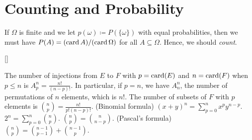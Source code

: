 \documentclass[../probability.tex]{subfiles}
\begin{document}
\section{Counting and Probability}

If \(\Omega\) is finite and we let \(p(\omega) \coloneqq P(\{\omega\})\)
with equal probabilities, then we must have
\(P(A) = (\operatorname{card} A)/(\operatorname{card} \Omega)\) for all \(A \subseteq \Omega\).
Hence, we should \emph{count}.

\begin{Example}{}[]
\begin{itemize}
    \ii
    The number of injections from \(E\) to \(F\)
    with \(p = \operatorname{card}(E)\) and \(n = \operatorname{card}(F)\) when \(p \le n\) is
    \(A_p^n = \frac{n!}{(n-p)!}\).
    \ii
    In particular, if \(p = n\), we have \(A_n^n\),
    the number of permutations of \(n\) elements, which is \(n!\).
    \ii
    The number of subsets of \(F\) with \(p\) elements is
    \(\binom{n}{p} = \frac{n!}{p!(n-p)!}\).
    \ii (Binomial formula)
    \((x+y)^n = \sum_{p=0}^n x^p y^{n-p}\).
    \(2^n = \sum_{p=0}^n \binom{n}{p}\).
    \ii \(\binom{n}{p} = \binom{n}{n-p}\).
    \ii (Pascal's formula) \(\binom{n}{p} = \binom{n-1}{p-1} + \binom{n-1}{p}\).
\end{itemize}
\end{Example}
\end{document}
